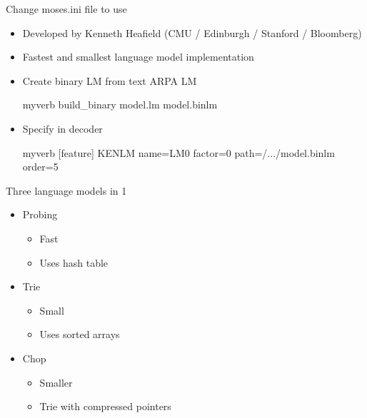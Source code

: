 \documentclass[landscape]{uedslides2C}
\begin{document}
\item Change moses.ini file to use
\begin{center}
\colorbox{gray}{}


\vspace{10mm}
\begin{itemize}
\item Developed by Kenneth Heafield (CMU / Edinburgh / Stanford / Bloomberg)
\item Fastest and smallest language model implementation
\item Create binary LM from text ARPA LM\\[5mm]
\begin{SaveVerbatim}{myverb} 
build_binary model.lm model.binlm
\end{SaveVerbatim}
\colorbox{gray}{}
\item Specify in decoder\\[5mm]
\begin{SaveVerbatim}{myverb} 
[feature]
KENLM name=LM0 factor=0 path=/.../model.binlm order=5
\end{SaveVerbatim}
\colorbox{gray}{}
\end{itemize}



Three language models in 1
\begin{itemize}
\item Probing
  \begin{itemize}
  \item Fast
  \item Uses hash table
  \end{itemize}
\item Trie
  \begin{itemize}
  \item Small
  \item Uses sorted arrays
  \end{itemize}
\item Chop
  \begin{itemize}
  \item Smaller
  \item Trie with compressed pointers
  \end{itemize}
\end{itemize}


\end{center}
\end{document}
